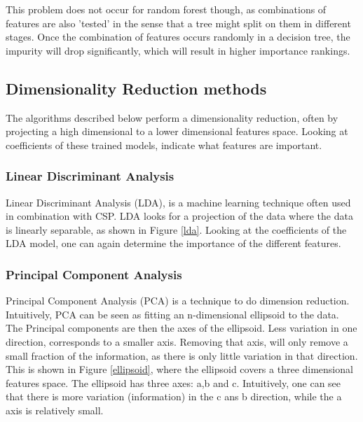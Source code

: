 \npar

This problem does not occur for random forest though, as combinations of features are also 'tested' in the sense that a tree might split on them in different stages. Once the combination of features occurs randomly in a decision tree, the impurity will drop significantly, which will result in higher importance rankings.

\subsection{Dimensionality Reduction methods}
The algorithms described below perform a dimensionality reduction, often by projecting a high dimensional to a lower dimensional features space. Looking at coefficients of these trained models, indicate what features are important.

\subsubsection{Linear Discriminant Analysis}
Linear Discriminant Analysis (LDA), is a machine learning technique often used in combination with CSP\cite{ErrorPotentials,svmldacomp,currTrends}. LDA looks for a projection of the data where the data is linearly separable, as shown in Figure \ref{lda}. Looking at the coefficients of the LDA model, one can again determine the importance of the different features.


\subsubsection{Principal Component Analysis}
Principal Component Analysis (PCA)  is a technique to do dimension reduction. Intuitively, PCA can be seen as fitting an n-dimensional ellipsoid to the data. The Principal components are then the axes of the ellipsoid. Less variation in one direction, corresponds to a smaller axis. Removing that axis, will only remove a small fraction of the information, as there is only little variation in that direction. This is shown in Figure \ref{ellipsoid}, where the ellipsoid covers a three dimensional features space. The ellipsoid has three axes: a,b and c. Intuitively, one can see that there is more variation (information) in the c ans b direction, while the a axis is relatively small.


